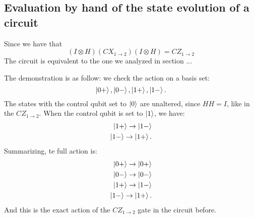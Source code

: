 \begin{figure}[h]
    \centering

\end{figure}


\subsection{Evaluation by hand of the state evolution of a circuit}
Since we have that
\begin{equation}
    (I \otimes H) (CX_{1 \to 2}) ( I \otimes H) = CZ_{1 \to 2}
\end{equation}
The circuit is equivalent to the one we analyzed in section ... 

The demonstration is as follow: we check the action on a basis set: 
\begin{equation}
    \ket{0+}, \ket{0-}, \ket{1+}, \ket{1-}.
\end{equation}
The states with the control qubit set to $\ket{0}$ are unaltered, since $HH=I$, like in the $CZ_{1\to2}$. 
When the control qubit is set to $\ket{1}$, we have:
\begin{align}
    \ket{1+} \to \ket{1-} \\
    \ket{1-}  \to \ket{1+}.
\end{align}
Summarizing, te full action is:
\begin{align}
    \ket{0+} \to \ket{0+} \\
    \ket{0-}  \to \ket{0-} \\
    \ket{1+} \to \ket{1-} \\
    \ket{1-}  \to \ket{1+}.
\end{align}
And this is the exact action of the $CZ_{1 \to 2}$ gate in the circuit before.

